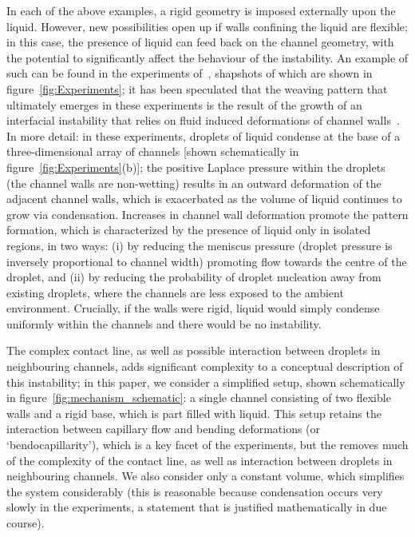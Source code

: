 \documentclass{jfm}
\begin{document}
In each of the above examples, a rigid geometry is imposed externally upon the liquid. However, new possibilities open up if walls confining the liquid are flexible; in this case, the presence of liquid can feed back on the channel geometry, with the potential to significantly affect the behaviour of the instability. %
An example of such can be found in the experiments of~\citet{Seemann2011JPhysCondMat}, shapshots of which are shown in figure~\ref{fig:Experiments}; it has been speculated that the weaving pattern that ultimately emerges in these experiments is the result of the growth of an interfacial instability that relies on fluid induced deformations of channel walls~\citep{BradleyPhDthesis}. In more detail: in these experiments, droplets of liquid condense at the base of a three-dimensional array of channels [shown schematically in figure~\ref{fig:Experiments}(b)]; the positive Laplace pressure within the droplets (the channel walls are non-wetting) results in an outward deformation of the adjacent channel walls, which is exacerbated as the volume of liquid continues to grow via condensation. Increases in channel wall deformation promote the pattern formation, which is characterized by the presence of liquid only in isolated regions, in two ways: (i) by reducing the meniscus pressure (droplet pressure is inversely proportional to channel width) promoting flow towards the centre of the droplet, and (ii) by reducing the probability of droplet nucleation away from existing droplets, where the channels are less exposed to the ambient environment. Crucially, if the walls were rigid, liquid would simply condense uniformly within the channels and there would be no instability. 

The complex contact line, as well as possible interaction between droplets in neighbouring channels, adds significant complexity to a conceptual description of this instability; in this paper, we consider a simplified setup, shown schematically in figure~\ref{fig:mechanism_schematic}: a single channel consisting of two flexible walls and a rigid base, which is part filled with liquid. This setup retains the interaction between capillary flow and bending deformations (or `bendocapillarity'), which is a key facet of the experiments, but the removes much of the complexity of the contact line, as well as interaction between droplets in neighbouring channels. We also consider only a constant volume, which simplifies the system considerably (this is reasonable because condensation occurs very slowly in the experiments, a statement that is justified mathematically in due course).
\end{document}
